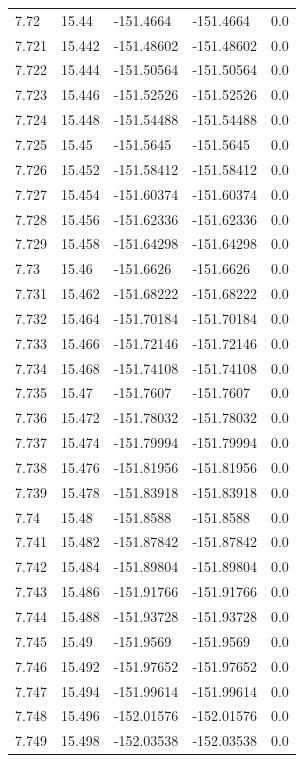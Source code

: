 \begin{tabular}{lllll}
7.72 & 15.44 & -151.4664 & -151.4664 & 0.0 \\
7.721 & 15.442 & -151.48602 & -151.48602 & 0.0 \\
7.722 & 15.444 & -151.50564 & -151.50564 & 0.0 \\
7.723 & 15.446 & -151.52526 & -151.52526 & 0.0 \\
7.724 & 15.448 & -151.54488 & -151.54488 & 0.0 \\
7.725 & 15.45 & -151.5645 & -151.5645 & 0.0 \\
7.726 & 15.452 & -151.58412 & -151.58412 & 0.0 \\
7.727 & 15.454 & -151.60374 & -151.60374 & 0.0 \\
7.728 & 15.456 & -151.62336 & -151.62336 & 0.0 \\
7.729 & 15.458 & -151.64298 & -151.64298 & 0.0 \\
7.73 & 15.46 & -151.6626 & -151.6626 & 0.0 \\
7.731 & 15.462 & -151.68222 & -151.68222 & 0.0 \\
7.732 & 15.464 & -151.70184 & -151.70184 & 0.0 \\
7.733 & 15.466 & -151.72146 & -151.72146 & 0.0 \\
7.734 & 15.468 & -151.74108 & -151.74108 & 0.0 \\
7.735 & 15.47 & -151.7607 & -151.7607 & 0.0 \\
7.736 & 15.472 & -151.78032 & -151.78032 & 0.0 \\
7.737 & 15.474 & -151.79994 & -151.79994 & 0.0 \\
7.738 & 15.476 & -151.81956 & -151.81956 & 0.0 \\
7.739 & 15.478 & -151.83918 & -151.83918 & 0.0 \\
7.74 & 15.48 & -151.8588 & -151.8588 & 0.0 \\
7.741 & 15.482 & -151.87842 & -151.87842 & 0.0 \\
7.742 & 15.484 & -151.89804 & -151.89804 & 0.0 \\
7.743 & 15.486 & -151.91766 & -151.91766 & 0.0 \\
7.744 & 15.488 & -151.93728 & -151.93728 & 0.0 \\
7.745 & 15.49 & -151.9569 & -151.9569 & 0.0 \\
7.746 & 15.492 & -151.97652 & -151.97652 & 0.0 \\
7.747 & 15.494 & -151.99614 & -151.99614 & 0.0 \\
7.748 & 15.496 & -152.01576 & -152.01576 & 0.0 \\
7.749 & 15.498 & -152.03538 & -152.03538 & 0.0 \\

\end{tabular}
